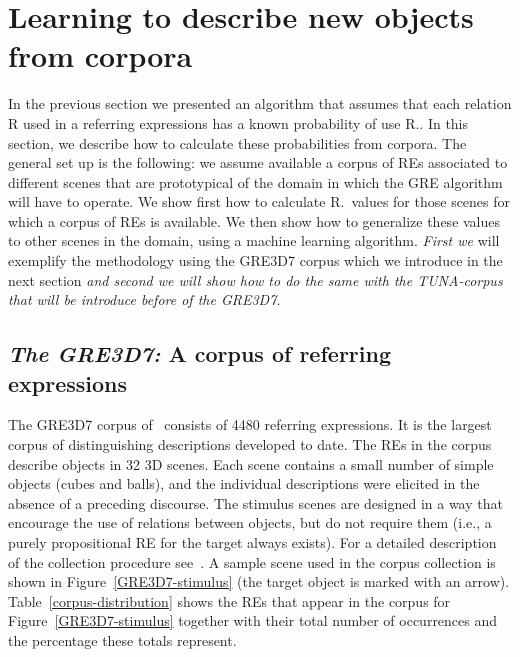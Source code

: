 \section{Learning to describe new objects from corpora}\label{sec:learning}

In the previous section we presented an algorithm that assumes that each relation R 
used in a referring expressions has a known probability of use R.\puse. In this section, 
we describe how to calculate these probabilities from corpora.  
The general set up is the following: we assume available a corpus of REs associated 
to different scenes that are prototypical of the domain in which the GRE algorithm will have to operate.   
We show first how to calculate R.\puse\ values for those scenes for which a corpus of REs is available.  
We then show how to generalize these values to 
other scenes in the domain, using a machine learning algorithm. \textit{First we} will exemplify the methodology using 
the GRE3D7 corpus which we introduce in the next section \textit{and second we will show how to do the same with the TUNA-corpus 
that will be introduce before of the GRE3D7.}

\subsection{\textit{The GRE3D7:} A corpus of referring expressions}

The GRE3D7 corpus of~ consists of 4480 referring expressions. 
It is the largest corpus of distinguishing descriptions developed to date. 
The REs in the corpus describe objects in 32 3D scenes. Each scene contains a small number of simple objects 
(cubes and balls), and the individual descriptions were elicited in the absence of a preceding discourse. 
The stimulus scenes are designed in a way that encourage the use of relations between objects, but do not require them 
(i.e., a purely propositional RE for the target always exists). For a detailed description of the collection procedure 
see~\cite[Chapter 5]{viet:gene11}. A sample scene used in the corpus collection is shown in Figure~\ref{GRE3D7-stimulus} 
(the target object is marked with an arrow). Table~\ref{corpus-distribution} shows the REs that appear in the corpus for 
Figure~\ref{GRE3D7-stimulus} together with their total number of occurrences and the percentage these totals represent.  

